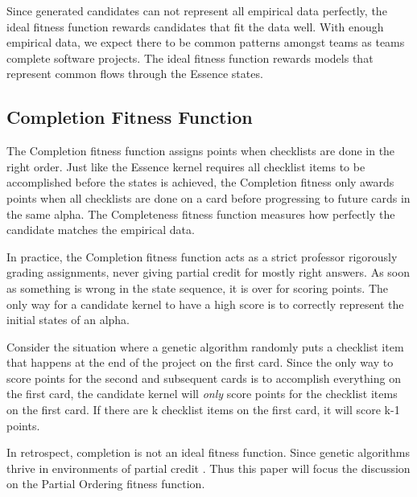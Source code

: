 \documentclass[preprint,12pt,3p]{elsarticle}
\begin{document}
Since generated candidates can not represent all empirical data perfectly, the ideal fitness function rewards candidates that fit the data well. With enough empirical data, we expect there to be common patterns amongst teams as teams complete software projects. The ideal fitness function rewards models that represent common flows through the Essence states.

\subsection{Completion Fitness Function}
The Completion fitness function assigns points when checklists are done in the right order. Just like the Essence kernel requires all checklist items to be accomplished before the states is achieved, the Completion fitness only awards points when all checklists are done on a card before progressing to future cards in the same alpha. The Completeness fitness function measures how perfectly the candidate matches the empirical data. 


In practice, the Completion fitness function acts as a strict professor rigorously grading assignments, never giving partial credit for mostly right answers. As soon as something is wrong in the state sequence, it is over for scoring points. The only way for a candidate kernel to have a high score is to correctly represent the initial states of an alpha.

Consider the situation where a genetic algorithm randomly puts a checklist item that happens at the end of the project on the first card. Since the only way to score points for the second and subsequent cards is to accomplish everything on the first card, the candidate kernel will \textit{only} score points for the checklist items on the first card. If there are k checklist items on the first card, it will score k-1 points.

In retrospect, completion is not an ideal fitness function. Since genetic algorithms thrive in environments of partial credit \cite{Eiben2003}. Thus this paper will focus the discussion on the Partial Ordering fitness function.
\end{document}
